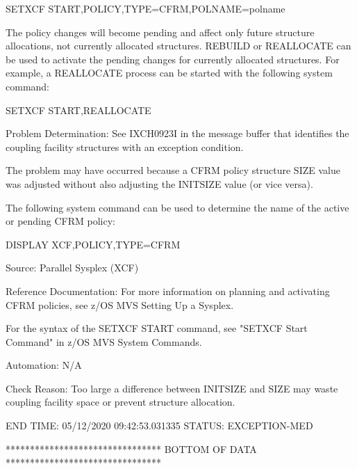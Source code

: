       SETXCF START,POLICY,TYPE=CFRM,POLNAME=polname                            

    The policy changes will become pending and affect only future              
    structure allocations, not currently allocated structures. REBUILD          
    or REALLOCATE can be used to activate the pending changes for              
    currently allocated structures. For example, a REALLOCATE process          
    can be started with the following system command:                          

       SETXCF START,REALLOCATE                                                 

   Problem Determination:  See IXCH0923I in the message buffer that             
    identifies the coupling facility structures with an exception              
    condition.                                                                 

    The problem may have occurred because a CFRM policy structure SIZE         
    value was adjusted without also adjusting the INITSIZE value (or           
    vice versa).                                                                

    The following system command can be used to determine the name of          
    the active or pending CFRM policy:                                         

       DISPLAY XCF,POLICY,TYPE=CFRM                                            

  Source:  Parallel Sysplex (XCF)                                              

  Reference Documentation:  For more information on planning and               
    activating CFRM policies, see z/OS MVS Setting Up a Sysplex.               

    For the syntax of the SETXCF START command, see "SETXCF Start              
    Command" in z/OS MVS System Commands.                                      

  Automation:  N/A                                                             

  Check Reason:  Too large a difference between INITSIZE and SIZE may          
    waste coupling facility space or prevent structure allocation.             

END TIME: 05/12/2020 09:42:53.031335  STATUS: EXCEPTION-MED
                     
******************************** BOTTOM OF DATA ********************************